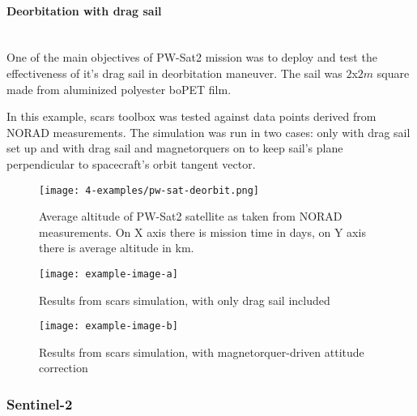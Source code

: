     \paragraph*{Deorbitation with drag sail}\hspace{0pt} \\
        One of the main objectives of PW-Sat2 mission was to deploy and test the effectiveness of it's drag sail in deorbitation maneuver. The sail was  $2$x$2m$ square made from aluminized polyester boPET film.\cite{pwsat2dt}
        
        In this example, \ac{scars} toolbox was tested against data points derived from NORAD measurements. The simulation was run in two cases: only with drag sail set up and with drag sail and magnetorquers on to keep sail's plane perpendicular to spacecraft's orbit tangent vector.
         
        \begin{figure}[H]
            \centering
            \texttt{[image: 4-examples/pw-sat-deorbit.png]}
            \caption{Average altitude of PW-Sat2 satellite as taken from NORAD measurements. On X axis there is mission time in days, on Y axis there is average altitude in km.}
            \label{fig:pw-sat-deorbit}
        \end{figure}
         
        \begin{figure}[H]
            \centering
            \texttt{[image: example-image-a]}
            \caption{Results from \ac{scars} simulation, with only drag sail included}
            \label{fig:scars-deorbit}
        \end{figure}
         
        \begin{figure}[H]
            \centering
            \texttt{[image: example-image-b]}
            \caption{Results from \ac{scars} simulation, with magnetorquer-driven attitude correction}
            \label{fig:scars-deorbit}
        \end{figure}




    \subsubsection{Sentinel-2} 
    
